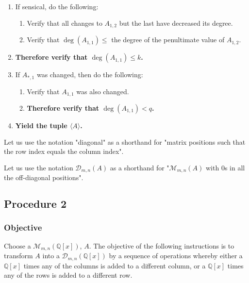 \documentclass[twocolumn]{article}
\begin{document}
\begin{enumerate}
					\item If sensical, do the following:
					\begin{enumerate}
						\item Verify that all changes to $A_{1,2}$ but the last have decreased its degree.
						\item Verify that $\deg(A_{1,1})\le$ the degree of the penultimate value of $A_{1,2}$.
					\end{enumerate}
					\item \textbf{Therefore verify that $\deg(A_{1,1})\le k$.}
					\item If $A_{*,1}$ was changed, then do the following:
					\begin{enumerate}
						\item Verify that $A_{1,1}$ was also changed.
						\item \textbf{Therefore verify that $\deg(A_{1,1})<q$.}
					\end{enumerate}
					\item \textbf{Yield the tuple $\langle A\rangle$.}
				\end{enumerate}
		Let us use the notation "diagonal" as a shorthand for "matrix positions such that the row index equals the column index".
		
		Let us use the notation $\mathcal{D}_{m,n}(A)$ as a shorthand for "$\mathcal{M}_{m,n}(A)$ with $0$s in all the off-diagonal positions".
		\subsection{Procedure 2}\label{sec:procedure 2}
			\subsubsection{Objective}
				Choose a $\mathcal{M}_{m,n}(\mathbb{Q}[x])$, $A$. The objective of the following instructions is to transform $A$ into a $\mathcal{D}_{m,n}(\mathbb{Q}[x])$ by a sequence of operations whereby either a $\mathbb{Q}[x]$ times any of the columns is added to a different column, or a $\mathbb{Q}[x]$ times any of the rows is added to a different row.
\end{document}

